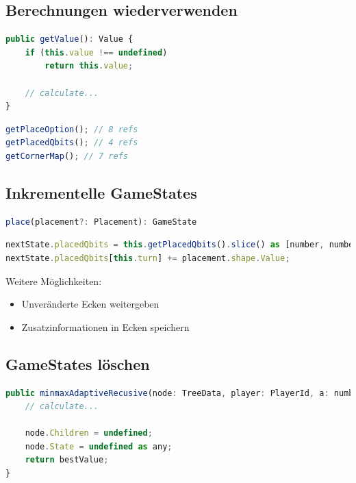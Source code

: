 \documentclass[12pt]{beamer}
\begin{document}
\subsection{Berechnungen wiederverwenden}
\begin{frame}[fragile]
	\begin{lstlisting}[language=JavaScript]
public getValue(): Value {
	if (this.value !== undefined)
		return this.value;
	
	// calculate...
}
	\end{lstlisting}
	\pause
	\begin{lstlisting}[language=JavaScript]
getPlaceOption(); // 8 refs
getPlacedQbits(); // 4 refs
getCornerMap(); // 7 refs
	\end{lstlisting}
\end{frame}

\subsection{Inkrementelle GameStates}
\begin{frame}[fragile]
	\begin{lstlisting}[language=JavaScript]
place(placement?: Placement): GameState
	\end{lstlisting}
	\pause
	\begin{lstlisting}[language=JavaScript]
nextState.placedQbits = this.getPlacedQbits().slice() as [number, number];
nextState.placedQbits[this.turn] += placement.shape.Value;
	\end{lstlisting}  
	\pause
	Weitere Möglichkeiten:\\
	\begin{itemize} [<+(1)->]
		\item Unveränderte Ecken weitergeben
		\item Zusatzinformationen in Ecken speichern
	\end{itemize}
\end{frame}

\subsection{GameStates löschen}
\begin{frame}[fragile]
	\begin{lstlisting}[language=JavaScript]
public minmaxAdaptiveRecusive(node: TreeData, player: PlayerId, a: number, b: number): number {
	// calculate...

	node.Children = undefined;
	node.State = undefined as any;
	return bestValue;
}
	\end{lstlisting}  
\end{frame}
\end{document}
